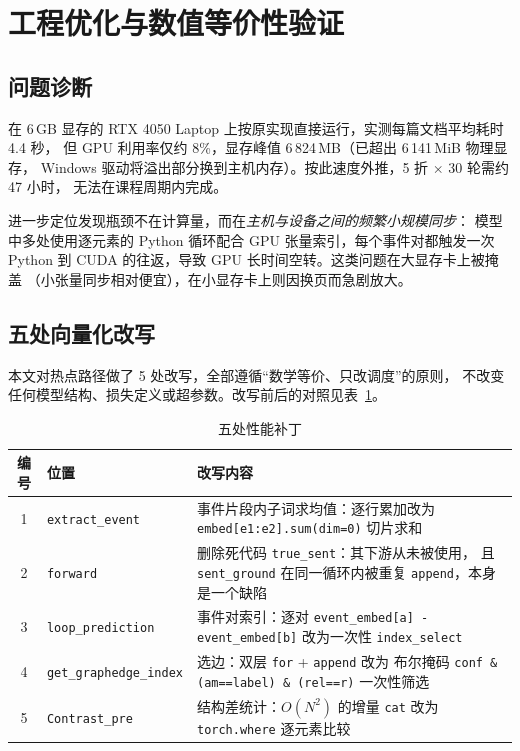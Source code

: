 \section{工程优化与数值等价性验证}
\label{sec:engineering}

\subsection{问题诊断}

在 6\,GB 显存的 RTX 4050 Laptop 上按原实现直接运行，实测每篇文档平均耗时 4.4 秒，
但 GPU 利用率仅约 8\%，显存峰值 6\,824\,MB（已超出 6\,141\,MiB 物理显存，
Windows 驱动将溢出部分换到主机内存）。按此速度外推，5 折 $\times$ 30 轮需约 47 小时，
无法在课程周期内完成。

进一步定位发现瓶颈不在计算量，而在\emph{主机与设备之间的频繁小规模同步}：
模型中多处使用逐元素的 Python 循环配合 GPU 张量索引，每个事件对都触发一次
Python 到 CUDA 的往返，导致 GPU 长时间空转。这类问题在大显存卡上被掩盖
（小张量同步相对便宜），在小显存卡上则因换页而急剧放大。

\subsection{五处向量化改写}

本文对热点路径做了 5 处改写，全部遵循“数学等价、只改调度”的原则，
不改变任何模型结构、损失定义或超参数。改写前后的对照见表~\ref{tab:patch}。

\begin{table}[H]
\centering
\caption{五处性能补丁}
\label{tab:patch}
\small
\begin{tabularx}{\textwidth}{@{}c l X@{}}
\toprule
编号 & 位置 & 改写内容\\
\midrule
1 & \texttt{extract\_event} & 事件片段内子词求均值：逐行累加改为
  \texttt{embed[e1:e2].sum(dim=0)} 切片求和\\
2 & \texttt{forward} & 删除死代码 \texttt{true\_sent}：其下游从未被使用，
  且 \texttt{sent\_ground} 在同一循环内被重复 \texttt{append}，本身是一个缺陷\\
3 & \texttt{loop\_prediction} & 事件对索引：逐对 \texttt{event\_embed[a] - event\_embed[b]}
  改为一次性 \texttt{index\_select}\\
4 & \texttt{get\_graphedge\_index} & 选边：双层 \texttt{for} + \texttt{append} 改为
  布尔掩码 \texttt{conf \& (am==label) \& (rel==r)} 一次性筛选\\
5 & \texttt{Contrast\_pre} & 结构差统计：$O(N^2)$ 的增量 \texttt{cat} 改为
  \texttt{torch.where} 逐元素比较\\
\bottomrule
\end{tabularx}
\end{table}

